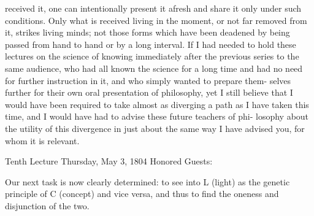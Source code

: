 received it, one can intentionally present it afresh and share it only under such
conditions.
 Only what is received living in the moment, or not far removed
from it, strikes living minds; not those forms which have been deadened by
being passed from hand to hand or by a long interval.
 If I had needed to hold
these lectures on the science of knowing immediately after the previous series
to the same audience, who had all known the science for a long time and had
no need for further instruction in it, and who simply wanted to prepare them-
selves further for their own oral presentation of philosophy, yet I still believe
that I would have been required to take almost as diverging a path as I have
taken this time, and I would have had to advise these future teachers of phi-
losophy about the utility of this divergence in just about the same way I have
advised you, for whom it is relevant.

Tenth Lecture
Thursday, May 3, 1804
Honored Guests:

Our next task is now clearly determined:
to see into L (light) as
the genetic principle of C (concept) and vice versa,
and thus to find the oneness and disjunction of the two.

